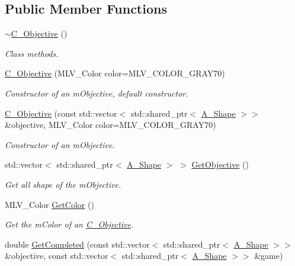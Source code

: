 \subsection*{Public Member Functions}
\begin{DoxyCompactItemize}
\item 
\hyperlink{classC__Objective_a4e05cb06acbee6d49734e2696cd419e9}{$\sim$\+C\+\_\+\+Objective} ()
\begin{DoxyCompactList}\small\item\em Class methods. \end{DoxyCompactList}\item 
\hyperlink{classC__Objective_aedbb7d27ece1f7894285398ae79ea588}{C\+\_\+\+Objective} (M\+L\+V\+\_\+\+Color color=M\+L\+V\+\_\+\+C\+O\+L\+O\+R\+\_\+\+G\+R\+A\+Y70)
\begin{DoxyCompactList}\small\item\em Constructor of an m\+Objective, default constructor. \end{DoxyCompactList}\item 
\hyperlink{classC__Objective_ae92eb6210a460fa7b551651584790ac8}{C\+\_\+\+Objective} (const std\+::vector$<$ std\+::shared\+\_\+ptr$<$ \hyperlink{classA__Shape}{A\+\_\+\+Shape} $>$$>$ \&objective, M\+L\+V\+\_\+\+Color color=M\+L\+V\+\_\+\+C\+O\+L\+O\+R\+\_\+\+G\+R\+A\+Y70)
\begin{DoxyCompactList}\small\item\em Constructor of an m\+Objective. \end{DoxyCompactList}\item 
std\+::vector$<$ std\+::shared\+\_\+ptr$<$ \hyperlink{classA__Shape}{A\+\_\+\+Shape} $>$ $>$ \hyperlink{classC__Objective_aa8e3dea19bd4578246b183d2bad2d475}{Get\+Objective} ()
\begin{DoxyCompactList}\small\item\em Get all shape of the m\+Objective. \end{DoxyCompactList}\item 
M\+L\+V\+\_\+\+Color \hyperlink{classC__Objective_aeaaa69ca15b1e1d8edbc3f1920399964}{Get\+Color} ()
\begin{DoxyCompactList}\small\item\em Get the m\+Color of an \hyperlink{classC__Objective}{C\+\_\+\+Objective}. \end{DoxyCompactList}\item 
double \hyperlink{classC__Objective_a026149982f0d62ea0a039a8b94bbaae0}{Get\+Completed} (const std\+::vector$<$ std\+::shared\+\_\+ptr$<$ \hyperlink{classA__Shape}{A\+\_\+\+Shape} $>$$>$ \&objective, const std\+::vector$<$ std\+::shared\+\_\+ptr$<$ \hyperlink{classA__Shape}{A\+\_\+\+Shape} $>$$>$ \&game)
\end{DoxyCompactItemize}
